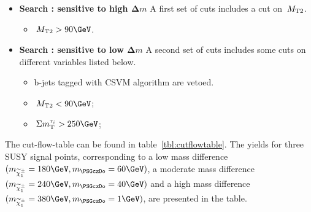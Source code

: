 \begin{itemize}
\item \textbf{Search \binone: sensitive to high $\boldsymbol\Delta m$}
A first set of cuts includes a cut on $\,{M_{\rm T2}}$.
\begin{itemize}
\item $\mttwo>90\GeV$.
\end{itemize}
\item \textbf{Search \bintwo: sensitive to low $\boldsymbol\Delta m$}
A second set of cuts includes some cuts on different variables listed below.
\begin{itemize}
\item b-jets tagged with CSVM algorithm are vetoed.
\item $\mttwo<90\GeV$;
\item $\SumMT>250\GeV$;
\end{itemize}
\end{itemize}
The cut-flow-table can be found in table~\ref{tbl:cutflowtable}. The yields for three SUSY signal points, corresponding to a low mass difference $(m_{\chione}=180\GeV,m_{\PSGczDo}=60\GeV)$, a moderate mass difference $(m_{\chione}=240\GeV,m_{\PSGczDo}=40\GeV)$ and a high mass difference $(m_{\chione}=380\GeV,m_{\PSGczDo}=1\GeV)$, are presented in the table.   
